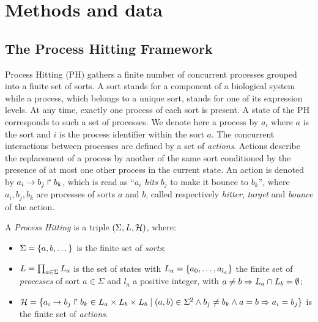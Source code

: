 \documentclass[11pt,a4paper,twoside]{epig}
\begin{document}
\vspace{3mm}
\noindent

\section{Methods and data}
\subsection{The Process  Hitting Framework}
\label{ssec:PH}



Process Hitting (PH) gathers a finite number of concurrent processes grouped into a finite set of sorts.
A sort stands for a component of a biological system while a process, which belongs to a unique sort, stands
for one of its expression levels. At any time, exactly one process of each sort is present. A state of the 
PH corresponds to such a set of processes. We denote here a process by $a_i$ where $a$ 
is the sort and $i$ is the process identifier within the sort $a$.
The concurrent interactions between processes are defined by a set of \emph{actions}.
Actions describe the replacement of a process by another of the same sort conditioned by the presence 
of at most one other process in the current state. An action is denoted by $a_i\rightarrow b_j\Rsh b_k$, 
which is read as ``$a_i$ \emph{hits} $b_j$ to make it bounce to $b_k$'', where $a_i,b_j,b_k$ are 
processes of sorts $a$ and $b$, called respectively \emph{hitter}, \emph{target} and \emph{bounce} of 
the action.

\begin{definition}\label{def:PH}
A \emph{Process Hitting} is a triple $(\Sigma,L,\mathcal{H})$, where:
\begin{itemize}
\item $\Sigma = \{a,b,\dots\}$ is the finite set of \emph{sorts};
\item $L = \prod_{a\in\Sigma} L_a$ is the set of states with $L_a = \{a_0,\dots,a_{l_a}\}$
the finite set of \emph{processes} of sort $a\in\Sigma$ and $l_a$ a positive integer, with $a\neq b\Rightarrow L_a \cap L_b = \emptyset$;
\item $\mathcal{H} = \{ a_i\rightarrow b_j\Rsh b_k \in L_a \times L_b \times L_b \mid (a,b) \in \Sigma^2
  \wedge b_j\neq b_k \wedge a=b\Rightarrow a_i=b_j\}$ is the finite set of \emph{actions}.
\end{itemize}
\end{definition}
\end{document}
